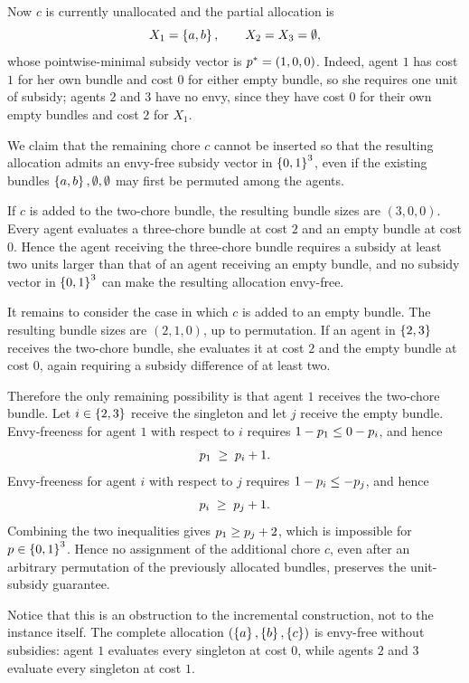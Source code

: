 \begin{example}
Now $c$ is currently unallocated and the partial allocation is
\[
  X_1 = \left\{a,b\right\}, \qquad X_2 = X_3 = \emptyset ,
\]
whose pointwise-minimal subsidy vector is $p^{*} = (1,0,0)$. Indeed,
agent $1$ has cost $1$ for her own bundle and cost $0$ for either empty bundle,
so she requires one unit of subsidy; agents $2$ and $3$ have no envy, since
they have cost $0$ for their own empty bundles and cost $2$ for $X_1$.

We claim that the remaining chore $c$ cannot be inserted so that the resulting
allocation admits an envy-free subsidy vector in $\left\{0,1\right\}^3$, even if the
existing bundles $\left\{a,b\right\}, \emptyset, \emptyset$ may first be permuted among
the agents.

If $c$ is added to the two-chore bundle, the resulting bundle sizes are
$(3,0,0)$. Every agent evaluates a three-chore bundle at cost $2$ and an empty
bundle at cost $0$. Hence the agent receiving the three-chore bundle requires a
subsidy at least two units larger than that of an agent receiving an empty
bundle, and no subsidy vector in $\left\{0,1\right\}^3$ can make the resulting
allocation envy-free.

It remains to consider the case in which $c$ is added to an empty bundle. The
resulting bundle sizes are $(2,1,0)$, up to permutation. If an agent in
$\left\{2,3\right\}$ receives the two-chore bundle, she evaluates it at cost $2$ and the
empty bundle at cost $0$, again requiring a subsidy difference of at least two.

Therefore the only remaining possibility is that agent $1$ receives the
two-chore bundle. Let $i \in \left\{2,3\right\}$ receive the singleton and let $j$
receive the empty bundle. Envy-freeness for agent $1$ with respect to $i$
requires $1 - p_1 \le 0 - p_i$, and hence
\[
  p_1 \;\ge\; p_i + 1 .
\]
Envy-freeness for agent $i$ with respect to $j$ requires
$1 - p_i \le -p_j$, and hence
\[
  p_i \;\ge\; p_j + 1 .
\]
Combining the two inequalities gives $p_1 \ge p_j + 2$, which is
impossible for $p \in \left\{0,1\right\}^3$. Hence no assignment of the
additional chore $c$, even after an arbitrary permutation of the previously
allocated bundles, preserves the unit-subsidy guarantee.

Notice that this is an obstruction to the incremental construction, not to the
instance itself. The complete allocation $(\left\{a\right\}, \left\{b\right\}, \left\{c\right\})$ is
envy-free without subsidies: agent $1$ evaluates every singleton at cost $0$,
while agents $2$ and $3$ evaluate every singleton at cost $1$.
\end{example}

